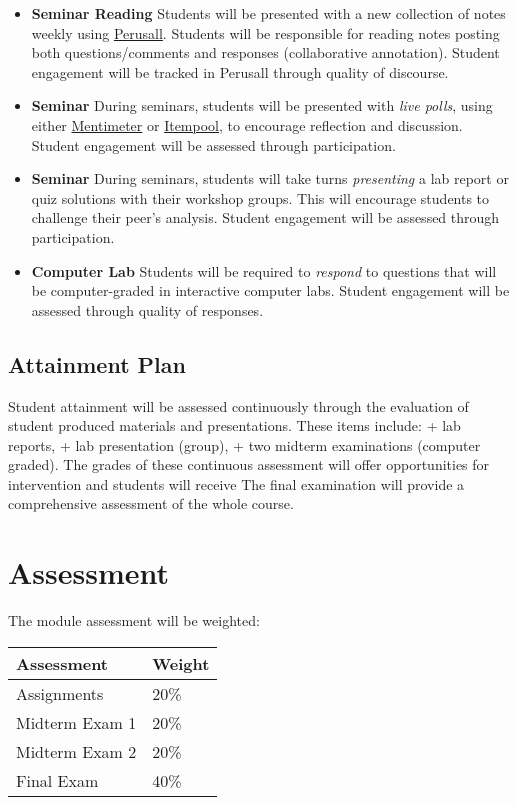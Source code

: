 \documentclass[
]{book}
\providecommand{\tightlist}{%
  \setlength{\itemsep}{0pt}\setlength{\parskip}{0pt}}
\begin{document}
\begin{itemize}
\tightlist
\item
  \textbf{Seminar Reading} Students will be presented with a new collection of notes weekly using \href{https://perusall.com/}{Perusall}. Students will be responsible for reading notes posting both questions/comments and responses (collaborative annotation). Student engagement will be tracked in Perusall through quality of discourse.
\item
  \textbf{Seminar} During seminars, students will be presented with \emph{live polls}, using either \href{https://www.mentimeter.com/}{Mentimeter} or \href{https://itempool.com/}{Itempool}, to encourage reflection and discussion. Student engagement will be assessed through participation.
\item
  \textbf{Seminar} During seminars, students will take turns \emph{presenting} a lab report or quiz solutions with their workshop groups. This will encourage students to challenge their peer's analysis. Student engagement will be assessed through participation.
\item
  \textbf{Computer Lab} Students will be required to \emph{respond} to questions that will be computer-graded in interactive computer labs. Student engagement will be assessed through quality of responses.
\end{itemize}

\hypertarget{attainment-plan}{%
\section{Attainment Plan}\label{attainment-plan}}

Student attainment will be assessed continuously through the evaluation of student produced materials and presentations. These items include:
+ lab reports,
+ lab presentation (group),
+ two midterm examinations (computer graded).
The grades of these continuous assessment will offer opportunities for intervention and students will receive
The final examination will provide a comprehensive assessment of the whole course.

\hypertarget{assessment}{%
\chapter{Assessment}\label{assessment}}

The module assessment will be weighted:

\begin{tabular}{l|l}
\hline
Assessment & Weight\\
\hline
Assignments & 20\%\\
\hline
Midterm Exam 1 & 20\%\\
\hline
Midterm Exam 2 & 20\%\\
\hline
Final Exam & 40\%\\
\hline
\end{tabular}
\end{document}
